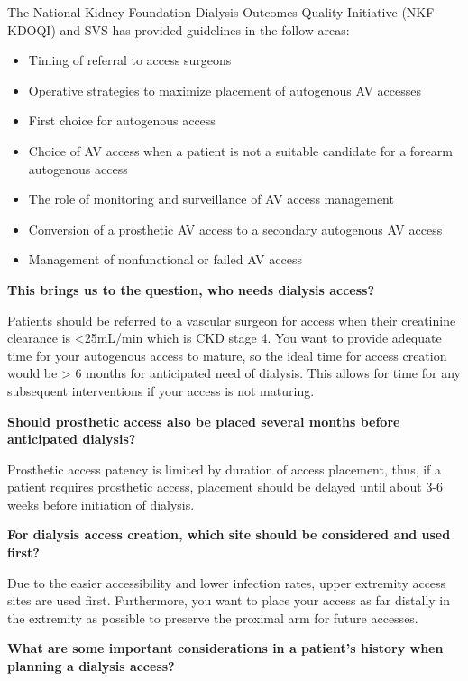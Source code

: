 \documentclass[
]{book}
\begin{document}
The National Kidney Foundation-Dialysis Outcomes Quality Initiative
(NKF-KDOQI) and SVS has provided guidelines in the follow
areas:\citep{nationalkidneyfoundation2015, sidawy2008}

\begin{itemize}
\item
  Timing of referral to access surgeons
\item
  Operative strategies to maximize placement of autogenous AV accesses
\item
  First choice for autogenous access
\item
  Choice of AV access when a patient is not a suitable candidate for a
  forearm autogenous access
\item
  The role of monitoring and surveillance of AV access management
\item
  Conversion of a prosthetic AV access to a secondary autogenous AV
  access
\item
  Management of nonfunctional or failed AV access
\end{itemize}

\textbf{This brings us to the question, who needs dialysis access?}

Patients should be referred to a vascular surgeon for access when their
creatinine clearance is \textless25mL/min which is CKD stage 4. You want to
provide adequate time for your autogenous access to mature, so the ideal
time for access creation would be \textgreater{} 6 months for anticipated need of
dialysis. This allows for time for any subsequent interventions if your
access is not maturing.

\textbf{Should prosthetic access also be placed several months before
anticipated dialysis?}

Prosthetic access patency is limited by duration of access placement,
thus, if a patient requires prosthetic access, placement should be
delayed until about 3-6 weeks before initiation of
dialysis.\citep{nationalkidneyfoundation2015}

\textbf{For dialysis access creation, which site should be considered and used
first?}

Due to the easier accessibility and lower infection rates, upper
extremity access sites are used first. Furthermore, you want to place
your access as far distally in the extremity as possible to preserve the
proximal arm for future accesses.

\textbf{What are some important considerations in a patient's history when
planning a dialysis access?}
\end{document}
